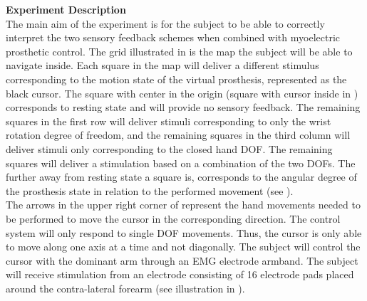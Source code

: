 \textbf{{\Large Experiment Description}} \\
\newline
The main aim of the experiment is for the subject to be able to correctly interpret the two sensory feedback schemes when combined with myoelectric prosthetic control. The grid illustrated in  is the map the subject will be able to navigate inside. Each square in the map will deliver a different stimulus corresponding to the motion state of the virtual prosthesis, represented as the black cursor. The square with center in the origin (square with cursor inside in ) corresponds to resting state and will provide no sensory feedback. The remaining squares in the first row will deliver stimuli corresponding to only the wrist rotation degree of freedom, and the remaining squares in the third column will deliver stimuli only corresponding to the closed hand DOF. The remaining squares will deliver a stimulation based on a combination of the two DOFs. The further away from resting state a square is, corresponds to the angular degree of the prosthesis state in relation to the performed movement (see ). \\
The arrows in the upper right corner of  represent the hand movements needed to be performed to move the cursor in the corresponding direction. The control system will only respond to single DOF movements. Thus, the cursor is only able to move along one axis at a time and not diagonally. The subject will control the cursor with the dominant arm through an EMG electrode armband. The subject will receive stimulation from an electrode consisting of 16 electrode pads placed around the contra-lateral forearm (see illustration in ).

